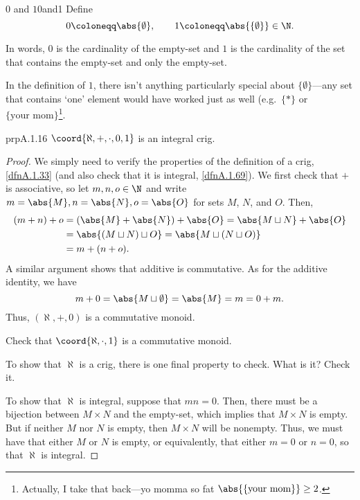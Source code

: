 \begin{dfn}{$0$ and $1$}{0and1}
Define
\begin{equation}
0\coloneqq \abs{\emptyset},\qquad 1\coloneqq \abs{\{ \emptyset \}}\in \N .
\end{equation}
\begin{rmk}
In words, $0$ is the cardinality of the empty-set and $1$ is the cardinality of the set that contains the empty-set and only the empty-set.
\end{rmk}
\begin{rmk}
In the definition of $1$, there isn't anything particularly special about $\{ \emptyset \}$---any set that contains `one' element would have worked just as well (e.g.~$\{ *\}$ or $\{ \text{your mom}\}$\footnote{Actually, I take that back---yo momma so fat $\abs{\{ \text{your mom}\}}\geq 2$.}.
\end{rmk}
\end{dfn}
\begin{prp}{}{prpA.1.16}
$\coord{\aleph ,+,\cdot ,0,1}$ is an integral crig.
\begin{proof}
We simply need to verify the properties of the definition of a crig, \cref{dfnA.1.33} (and also check that it is integral, \cref{dfnA.1.69}).  We first check that $+$ is associative, so let $m,n,o\in \N$ and write $m=\abs{M},n=\abs{N},o=\abs{O}$ for sets $M$, $N$, and $O$.  Then,
\begin{equation}
\begin{split}
(m+n)+o & =\left( \abs{M}+\abs{N}\right) +\abs{O}=\abs{M\sqcup N}+\abs{O} \\
& =\abs{(M\sqcup N)\sqcup O}=\abs{M\sqcup (N\sqcup O)} \\
& =m+(n+o).
\end{split}
\end{equation}
A similar argument shows that additive is commutative.  As for the additive identity, we have
\begin{equation}
m+0=\abs{M\sqcup \emptyset}=\abs{M}=m=0+m.
\end{equation}
Thus, $(\aleph ,+,0)$ is a commutative monoid.

\begin{exr}[breakable=false]{}{}
Check that $\coord{\aleph ,\cdot ,1}$ is a commutative monoid.
\end{exr}
\begin{exr}[breakable=false]{}{}
To show that $\aleph$ is a crig, there is one final property to check.  What is it?  Check it.
\end{exr}

To show that $\aleph$ is integral, suppose that $mn=0$.  Then, there must be a bijection between $M\times N$ and the empty-set, which implies that $M\times N$ is empty.  But if neither $M$ nor $N$ is empty, then $M\times N$ will be nonempty.  Thus, we must have that either $M$ or $N$ is empty, or equivalently, that either $m=0$ or $n=0$, so that $\aleph$ is integral.
\end{proof}
\end{prp}

